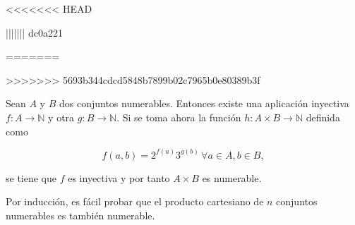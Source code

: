 \documentclass[
  a4paper,
]{scrreport}
\theoremstyle{definition}
\theoremstyle{remark}
\begin{document}
\begin{tcolorbox}
\begin{tcolorbox}
\begin{tcolorbox}
\begin{tcolorbox}
\begin{tcolorbox}
\begin{tcolorbox}
\begin{tcolorbox}
\begin{tcolorbox}
\begin{tcolorbox}
\begin{tcolorbox}
\begin{tcolorbox}
\begin{tcolorbox}
\begin{tcolorbox}
\begin{tcolorbox}
\begin{tcolorbox}
\begin{tcolorbox}
\begin{tcolorbox}
\begin{tcolorbox}
\begin{tcolorbox}
\begin{tcolorbox}
\begin{tcolorbox}
\begin{tcolorbox}
\begin{tcolorbox}
\begin{tcolorbox}
\begin{tcolorbox}
\begin{tcolorbox}
\begin{tcolorbox}
\begin{tcolorbox}
\begin{tcolorbox}
\begin{tcolorbox}
\begin{tcolorbox}
\begin{tcolorbox}
<<<<<<< HEAD
\begin{tcolorbox}[enhanced jigsaw, colbacktitle=quarto-callout-tip-color!10!white, opacitybacktitle=0.6, bottomrule=.15mm, coltitle=black, toptitle=1mm, colback=white, colframe=quarto-callout-tip-color-frame, breakable, bottomtitle=1mm, titlerule=0mm, title=\textcolor{quarto-callout-tip-color}{\faLightbulb}\hspace{0.5em}{Solución}, arc=.35mm, leftrule=.75mm, rightrule=.15mm, toprule=.15mm, opacityback=0, left=2mm]
||||||| dc0a221
\begin{tcolorbox}[enhanced jigsaw, breakable, title=\textcolor{quarto-callout-tip-color}{\faLightbulb}\hspace{0.5em}{Solución}, leftrule=.75mm, colback=white, colbacktitle=quarto-callout-tip-color!10!white, toprule=.15mm, rightrule=.15mm, bottomrule=.15mm, arc=.35mm, colframe=quarto-callout-tip-color-frame, opacitybacktitle=0.6, titlerule=0mm, opacityback=0, coltitle=black, toptitle=1mm, left=2mm, bottomtitle=1mm]
=======
\begin{tcolorbox}[enhanced jigsaw, rightrule=.15mm, colbacktitle=quarto-callout-tip-color!10!white, breakable, bottomrule=.15mm, toprule=.15mm, titlerule=0mm, opacitybacktitle=0.6, opacityback=0, colback=white, leftrule=.75mm, bottomtitle=1mm, colframe=quarto-callout-tip-color-frame, toptitle=1mm, title=\textcolor{quarto-callout-tip-color}{\faLightbulb}\hspace{0.5em}{Solución}, arc=.35mm, left=2mm, coltitle=black]
>>>>>>> 5693b344cdcd5848b7899b02c7965b0e80389b3f

Sean \(A\) y \(B\) dos conjuntos numerables. Entonces existe una
aplicación inyectiva \(f:A\to\mathbb{N}\) y otra \(g:B\to\mathbb{N}\).
Si se toma ahora la función \(h:A\times B\to \mathbb{N}\) definida como

\[ f(a,b) = 2^{f(a)}3^{g(b)}\, \forall a\in A, b\in B,\]

se tiene que \(f\) es inyectiva y por tanto \(A\times B\) es numerable.

Por inducción, es fácil probar que el producto cartesiano de \(n\)
conjuntos numerables es también numerable.


\end{tcolorbox}
\end{tcolorbox}
\end{tcolorbox}
\end{tcolorbox}
\end{tcolorbox}
\end{tcolorbox}
\end{tcolorbox}
\end{tcolorbox}
\end{tcolorbox}
\end{tcolorbox}
\end{tcolorbox}
\end{tcolorbox}
\end{tcolorbox}
\end{tcolorbox}
\end{tcolorbox}
\end{tcolorbox}
\end{tcolorbox}
\end{tcolorbox}
\end{tcolorbox}
\end{tcolorbox}
\end{tcolorbox}
\end{tcolorbox}
\end{tcolorbox}
\end{tcolorbox}
\end{tcolorbox}
\end{tcolorbox}
\end{tcolorbox}
\end{tcolorbox}
\end{tcolorbox}
\end{tcolorbox}
\end{tcolorbox}
\end{tcolorbox}
\end{tcolorbox}
\end{tcolorbox}
\end{tcolorbox}
\end{document}
